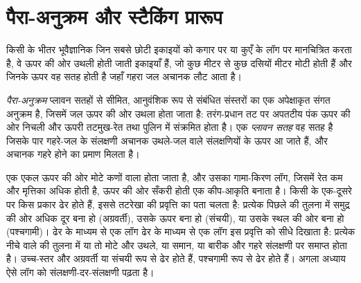 \section{पैरा-अनुक्रम और स्टैकिंग प्रारूप}\label{sec:b3:sequence-stratigraphy:parasequences}

किसी  के भीतर भूवैज्ञानिक जिन सबसे छोटी इकाइयों को कगार पर
या कुएँ के लॉग पर मानचित्रित करता है, वे ऊपर की ओर उथली होती जाती इकाइयाँ हैं,
जो कुछ मीटर से कुछ दसियों मीटर मोटी होती हैं और जिनके ऊपर वह सतह होती है जहाँ गहरा जल अचानक लौट आता है।

\begin{definition}[पैरा-अनुक्रम और प्लावन सतह]\label{def:b3:sequence-stratigraphy:parasequence}
\emph{पैरा-अनुक्रम} प्लावन सतहों से सीमित, आनुवंशिक रूप से संबंधित संस्तरों का एक अपेक्षाकृत संगत
अनुक्रम है, जिसमें जल ऊपर की ओर उथला होता जाता है: तरंग-प्रधान तट पर अपतटीय पंक
ऊपर की ओर निचली और ऊपरी तटमुख-रेत तथा पुलिन में संक्रमित होता है।
एक \emph{प्लावन
सतह} वह सतह है जिसके पार गहरे-जल के संलक्षणी अचानक
उथले-जल वाले संलक्षणियों के ऊपर आ जाते हैं, और अचानक गहरे होने का प्रमाण मिलता है।
\end{definition}

एक एकल  ऊपर की ओर मोटे कणों वाला होता जाता है, और उसका गामा-किरण लॉग,
जिसमें रेत कम और मृत्तिका अधिक होती है, ऊपर की ओर सँकरी होती एक कीप-आकृति बनाता है। किसी  के 
एक-दूसरे पर किस प्रकार ढेर होते हैं, इससे तटरेखा की प्रवृत्ति का पता चलता है:
प्रत्येक  पिछले की तुलना में समुद्र की ओर अधिक दूर बना हो (अग्रवर्ती),
उसके ऊपर बना हो (संचयी), या उसके स्थल की ओर बना हो (पश्चगामी)। ढेर के माध्यम से एक लॉग
ढेर के माध्यम से एक लॉग इस प्रवृत्ति को सीधे दिखाता है: प्रत्येक 
नीचे वाले की तुलना में या तो मोटे और उथले, या समान, या बारीक और गहरे संलक्षणी पर समाप्त होता है।
उच्च-स्तर और  अग्रवर्ती या संचयी रूप से ढेर होते हैं,
 पश्चगामी रूप से ढेर होते हैं। अगला अध्याय ऐसे लॉग को
संलक्षणी-दर-संलक्षणी पढ़ता है।

